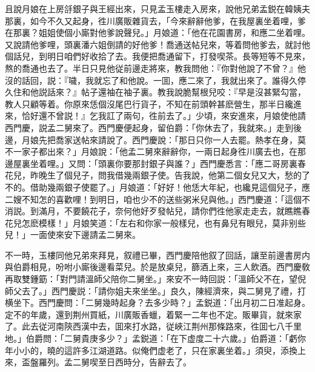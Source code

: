 且說月娘在上房㧱銀子與王經出來，只見孟玉樓走入房來，說他兄弟孟鋭在韓姨夫那裏，如今不久又起身，徃川廣販雜貨去，「今來辭辭他爹，在我屋裏坐着哩，爹在那裏？姐姐使個小廝對他爹說聲兒。」月娘道：「他在花園書房，和應二坐着哩。又說請他爹哩，頭裏潘六姐倒請的好他爹！喬通送帖兒來，等着問他爹去，就討他個話兒，到明日咱們好收拾了去。我便把喬通留下，打發喫茶。長等短等不見來，熬的喬通也去了。半日只見他従前邊走將來，教我問他：『你對他說了不曾？』他沒的話回，説：『噦，我就忘了和他說。一囬，應二來了，我就出來了。誰得久停久住和他説話來？』帖子還袖在袖子裏。教我說脆幫根兒咬：『早是沒甚緊勾當，教人只顧等着。你原來恁個沒尾巴行貨子，不知在前頭幹甚麽營生，那半日纔進來，恰好還不曾説！』乞我訌了兩句，徃前去了。」少頃，來安進來，月娘使他請西門慶，説孟二舅來了。西門慶便起身，留伯爵：「你休去了，我就來。」走到後邊，月娘先把喬家送帖來請說了。西門慶說：「那日只你一人去罷。熱孝在身，莫不一家子都出來？」月娘說：「他孟二舅來辭辭你，一兩日起身徃川廣去也，在那邊屋裏坐着哩。」又問：「頭裏你要那封銀子與誰？」西門慶悉言：「應二哥房裏春花兒，昨晚生了個兒子，問我借幾兩銀子使。告我說，他第二個女兒又大，愁的了不的。借助幾兩銀子使罷了。」月娘道：「好好！他恁大年紀，也纔見這個兒子，應二嫂不知怎的喜歡哩！到明日，咱也少不的送些粥米兒與他。」西門慶道：「這個不消説。到滿月，不要饒花子，奈何他好歹發帖兒，請你們徃他家走走去，就瞧瞧春花兒怎麽模樣！」月娘笑道：「左右和你家一般樣兒，也有鼻兒有眼兒，莫非别些兒！」一面使來安下邊請孟二舅來。

不一時，玉樓同他兄弟來拜見，叙禮已畢，西門慶陪他叙了回話，讓至前邊書房内與伯爵相見，吩咐小廝後邊看菜兒。於是放桌兒，篩酒上來，三人飲酒。西門慶敎再取雙鍾筯：「對門請溫師父陪你二舅坐。」來安不一時回説：「溫師父不在，望倪師父去了。」西門慶説：「請你姐夫來坐坐。」良久，陳經濟來，與二舅見了禮，打横坐下。西門慶問：「二舅幾時起身？去多少時？」孟鋭道：「出月初二日准起身。定不的年歲，還到荆州買紙，川廣販香蠟，着緊一二年也不定。販畢貨，就來家了。此去従河南陝西漢中去，囬來打水路，従峽江荆州那條路來，徃囬七八千里地。」伯爵問：「二舅貴庚多少？」孟鋭道：「在下虚度二十六歲。」伯爵道：「虧你年小小的，曉的這許多江湖道路。似俺們虚老了，只在家裏坐着。」須臾，添換上來，盃盤羅列。孟二舅喫至日西時分，告辭去了。

